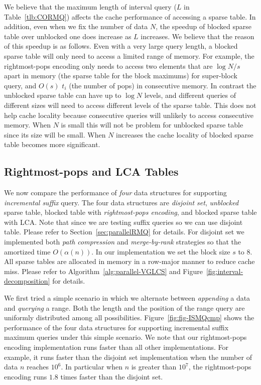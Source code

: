 We believe that the maximum length of interval query ($L$ in
Table~\ref{tlb:CORMQ}) affects the cache performance of accessing a
sparse table.  In addition, even when we fix the number of data $N$,
the speedup of blocked sparse table over unblocked one does increase
as $L$ increases.  We believe that the reason of this speedup is as
follows.  Even with a very large query length, a blocked sparse table
will only need to access a limited range of memory.  For example, the
rightmost-pops encoding only needs to access two elements that are
$\log {N/s}$ apart in memory (the sparse table for the block maximums)
for super-block query, and $O(s)$ $t_i$ (the number of pops) in
consecutive memory.  In contrast the unblocked sparse table can have
up to $\log N$ levels, and different queries of different sizes will
need to access different levels of the sparse table.  This does not
help cache locality because consecutive queries will unlikely to
access consecutive memory.  When $N$ is small this will not be problem
for unblocked sparse table since its size will be small.  When $N$
increases the cache locality of blocked sparse table becomes more
significant.



\subsection{Rightmost-pops and LCA Tables}

We now compare the performance of {\em four} data structures for
supporting {\em incremental suffix} query.  The four data structures
are {\em disjoint set}, {\em unblocked} sparse table, blocked table
with {\em rightmost-pops encoding}, and blocked sparse table with LCA.
Note that since we are testing suffix queries so we can use disjoint
table.  Please refer to Section~\ref{sec:parallelRMQ} for details.
For disjoint set we implemented both {\em path compression} and {\em
  merge-by-rank} strategies so that the amortized time $O(\alpha(n))$.
In our implementation we set the block size $s$ to $8$.  All sparse
tables are allocated in memory in a row-major manner to reduce cache
miss.  Please refer to Algorithm~\ref{alg:parallel-VGLCS} and
Figure~\ref{fig:interval-decomposition} for details.


We first tried a simple scenario in which we alternate between {\em
  appending} a data and {\em querying} a range.  Both the length and
the position of the range query are uniformly distributed among all
possibilities.  Figure~\ref{fig:fig-ISMQcmp} shows the performance of
the four data structures for supporting incremental suffix maximum
queries under this simple scenario.  We note that our rightmost-pops
encoding implementation runs faster than all other implementations.
For example, it runs faster than the disjoint set implementation when
the number of data $n$ reaches $10^6$.  In particular when $n$ is
greater than $10^7$, the rightmost-pops encoding runs $1.8$ times
faster than the disjoint set.



